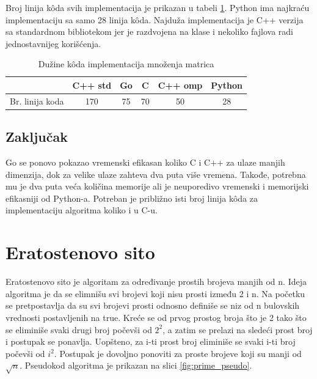 \documentclass[12pt,oneside]{memoir}
\begin{document}
Broj linija k\^{o}da svih  implementacija je prikazan u tabeli \ref{tab:matrix2}. Python ima najkraću implementaciju sa samo 28 linija k\^{o}da. Najduža implementacija je C++ verzija sa standardnom bibliotekom jer je razdvojena na klase i nekoliko fajlova radi jednostavnijeg korišćenja.  

\begin{table}
\begin{center}
\caption{Dužine k\^{o}da implementacija množenja matrica}
\begin{tabular}{|c|c|c|c|c|c|}
\hline
		& C++ std	&  Go 	& C	& C++ omp	& Python	\\ \hline
Br. linija koda&170		& 75	& 70	&50		&28		\\ \hline
\end{tabular}
\label{tab:matrix2}
\end{center}
\end{table}

\subsection{Zaključak}

Go se ponovo pokazao vremenski efikasan koliko C i C++ za ulaze manjih dimenzija, dok za velike ulaze zahteva dva puta više vremena. Takođe, potrebna mu je dva puta veća količina memorije ali je neuporedivo vremenski i memorijski efikasniji od Python-a. Potreban je približno isti broj linija k\^{o}da za implementaciju algoritma koliko i u C-u.



\section{Eratostenovo sito}
Eratostenovo sito je algoritam za određivanje prostih brojeva manjih od n. Ideja algoritma je da se elimnišu svi brojevi koji nisu prosti između 2 i n. Na početku se pretpostavlja da su svi brojevi prosti odnosno definiše se niz od n bulovskih vrednosti postavljenih na true. Kreće se od prvog prostog broja što je 2 tako što se eliminiše svaki drugi broj počevši od $2^{2}$, a zatim se prelazi na sledeći prost broj i postupak se ponavlja. Uopšteno, za i-ti prost broj eliminiše se svaki i-ti broj počevši od  $i^{2}$. Postupak je dovoljno ponoviti za proste brojeve koji su manji od $\sqrt{n}$. Pseudokod algoritma je prikazan na slici \ref{fig:prime_pseudo}.
\end{document}
